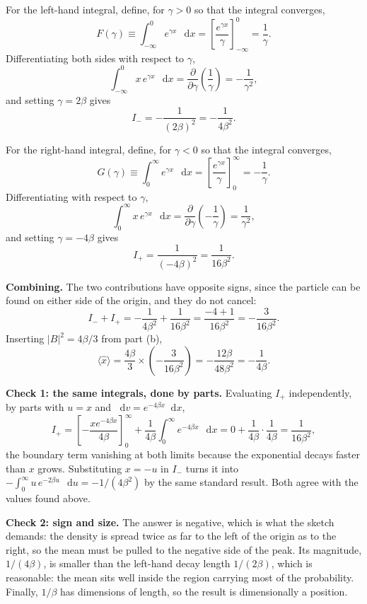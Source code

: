 \documentclass[12pt]{article}
\renewcommand{\d}{\mathop{}\!\mathrm{d}}
\begin{document}
\begin{solutionbox}
For the left-hand integral, define, for $\gamma>0$ so that the integral converges,
\[
    F(\gamma)\equiv\int_{-\infty}^{0}e^{\gamma x}\,\d x
    =\left[\frac{e^{\gamma x}}{\gamma}\right]_{-\infty}^{0}=\frac{1}{\gamma} .
\]
Differentiating both sides with respect to $\gamma$,
\[
    \int_{-\infty}^{0}x\,e^{\gamma x}\,\d x
    =\frac{\partial}{\partial\gamma}\left(\frac{1}{\gamma}\right)
    =-\frac{1}{\gamma^{2}} ,
\]
and setting $\gamma=2\beta$ gives
\[
    I_{-}=-\frac{1}{(2\beta)^{2}}=-\frac{1}{4\beta^{2}} .
\]

For the right-hand integral, define, for $\gamma<0$ so that the integral converges,
\[
    G(\gamma)\equiv\int_{0}^{\infty}e^{\gamma x}\,\d x
    =\left[\frac{e^{\gamma x}}{\gamma}\right]_{0}^{\infty}=-\frac{1}{\gamma} .
\]
Differentiating with respect to $\gamma$,
\[
    \int_{0}^{\infty}x\,e^{\gamma x}\,\d x
    =\frac{\partial}{\partial\gamma}\left(-\frac{1}{\gamma}\right)
    =\frac{1}{\gamma^{2}} ,
\]
and setting $\gamma=-4\beta$ gives
\[
    I_{+}=\frac{1}{(-4\beta)^{2}}=\frac{1}{16\beta^{2}} .
\]

\textbf{Combining.} The two contributions have opposite signs, since the particle can be found on either side of the origin, and they do not cancel:
\[
    I_{-}+I_{+}
    =-\frac{1}{4\beta^{2}}+\frac{1}{16\beta^{2}}
    =\frac{-4+1}{16\beta^{2}}
    =-\frac{3}{16\beta^{2}} .
\]
Inserting $|B|^{2}=4\beta/3$ from part (b),
\[
    \langle \hat{x}\rangle
    =\frac{4\beta}{3}\times\left(-\frac{3}{16\beta^{2}}\right)
    =-\frac{12\beta}{48\beta^{2}}
    =-\frac{1}{4\beta} .
\]

\textbf{Check 1: the same integrals, done by parts.} Evaluating $I_{+}$ independently, by parts with $u=x$ and $\d v=e^{-4\beta x}\d x$,
\[
    I_{+}=\left[-\frac{x e^{-4\beta x}}{4\beta}\right]_{0}^{\infty}
    +\frac{1}{4\beta}\int_{0}^{\infty}e^{-4\beta x}\,\d x
    =0+\frac{1}{4\beta}\cdot\frac{1}{4\beta}
    =\frac{1}{16\beta^{2}},
\]
the boundary term vanishing at both limits because the exponential decays faster than $x$ grows. Substituting $x=-u$ in $I_{-}$ turns it into $-\int_{0}^{\infty}u\,e^{-2\beta u}\,\d u=-1/(4\beta^{2})$ by the same standard result. Both agree with the values found above.

\textbf{Check 2: sign and size.} The answer is negative, which is what the sketch demands: the density is spread twice as far to the left of the origin as to the right, so the mean must be pulled to the negative side of the peak. Its magnitude, $1/(4\beta)$, is smaller than the left-hand decay length $1/(2\beta)$, which is reasonable: the mean sits well inside the region carrying most of the probability. Finally, $1/\beta$ has dimensions of length, so the result is dimensionally a position.


\end{solutionbox}
\end{document}
